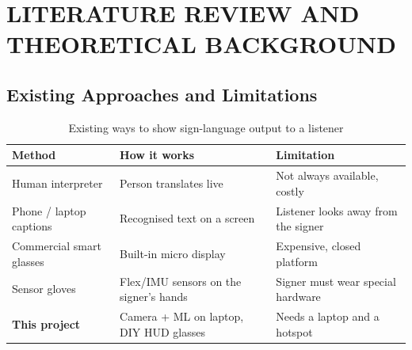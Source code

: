 \documentclass[12pt,a4paper]{report}
\begin{document}
\chapter{LITERATURE REVIEW AND THEORETICAL BACKGROUND}

\section{Existing Approaches and Limitations}

\begin{table}[H]
\centering
\caption{Existing ways to show sign-language output to a listener}
\label{tab:existing}
\begin{tabularx}{\linewidth}{L{3.4cm} X X}
\toprule
\textbf{Method} & \textbf{How it works} & \textbf{Limitation} \\
\midrule
Human interpreter & Person translates live & Not always available, costly \\
Phone / laptop captions & Recognised text on a screen & Listener looks away from the signer \\
Commercial smart glasses & Built-in micro display & Expensive, closed platform \\
Sensor gloves & Flex/IMU sensors on the signer's hands & Signer must wear special hardware \\
\textbf{This project} & Camera + ML on laptop, DIY HUD glasses & Needs a laptop and a hotspot \\
\bottomrule
\end{tabularx}
\end{table}
\end{document}
